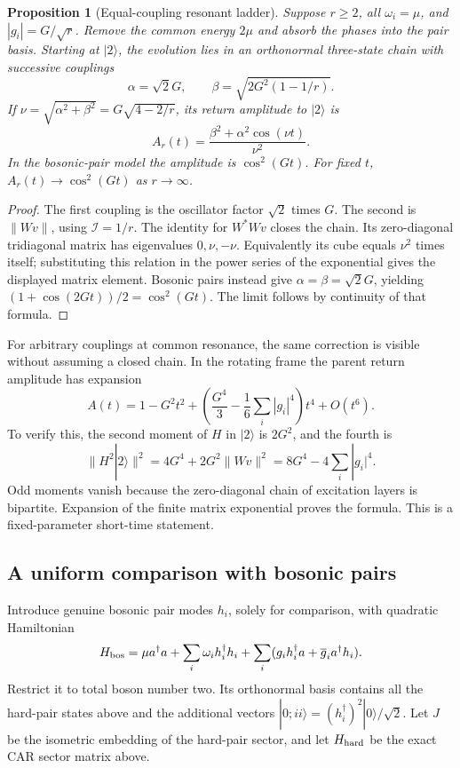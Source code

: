 \documentclass[11pt]{article}
\newtheorem{proposition}[theorem]{Proposition}
\theoremstyle{remark}
\begin{document}
\begin{proposition}[Equal-coupling resonant ladder]
\label{prop:v20v57-ladder}
Suppose \(r\geq2\), all \(\omega_i=\mu\), and
\(|g_i|=G/\sqrt r\).  Remove the common energy \(2\mu\)
and absorb the phases into the pair basis.  Starting at
\(|2\rangle\), the evolution lies in an orthonormal
three-state chain with successive couplings
\[
 \alpha=\sqrt2G,\qquad
 \beta=\sqrt{2G^2(1-1/r)}.
\]
If \(\nu=\sqrt{\alpha^2+\beta^2}=G\sqrt{4-2/r}\), its
return amplitude to \(|2\rangle\) is
\[
 A_r(t)=\frac{\beta^2+\alpha^2\cos(\nu t)}{\nu^2}.
\]
In the bosonic-pair model the amplitude is \(\cos^2(Gt)\).
For fixed \(t\), \(A_r(t)\to\cos^2(Gt)\) as \(r\to\infty\).
\end{proposition}
\begin{proof}
The first coupling is the oscillator factor \(\sqrt2\)
times \(G\).  The second is \(\|Wv\|\), using
\(\mathcal I=1/r\).  The identity for \(W^*Wv\) closes
the chain.  Its zero-diagonal tridiagonal matrix has
eigenvalues \(0,\nu,-\nu\).  Equivalently its cube equals
\(\nu^2\) times itself; substituting this relation in the
power series of the exponential gives the displayed
matrix element.  Bosonic pairs instead give
\(\alpha=\beta=\sqrt2G\), yielding
\((1+\cos(2Gt))/2=\cos^2(Gt)\).
The limit follows by continuity of that formula.
\end{proof}

For arbitrary couplings at common resonance, the same correction
is visible without assuming a closed chain.  In the rotating
frame the parent return amplitude has expansion
\[
 A(t)=1-G^2t^2+
 \left(\frac{G^4}{3}-\frac16\sum_i|g_i|^4\right)t^4+O(t^6).
\]
To verify this, the second moment of \(H\) in \(|2\rangle\)
is \(2G^2\), and the fourth is
\[
 \|H^2|2\rangle\|^2=4G^4+2G^2\|Wv\|^2
                       =8G^4-4\sum_i|g_i|^4.
\]
Odd moments vanish because the zero-diagonal chain of
excitation layers is bipartite.  Expansion of the finite
matrix exponential proves the formula.  This is a
fixed-parameter short-time statement.

\subsection{A uniform comparison with bosonic pairs}

Introduce genuine bosonic pair modes \(h_i\), solely for
comparison, with quadratic Hamiltonian
\[
 H_{\rm bos}=\mu a^\dagger a+\sum_i\omega_i h_i^\dagger h_i+
            \sum_i(g_i h_i^\dagger a+\overline g_i a^\dagger h_i).
\]
Restrict it to total boson number two.  Its orthonormal basis
contains all the hard-pair states above and the additional
vectors \(|0;ii\rangle=(h_i^\dagger)^2|0\rangle/\sqrt2\).
Let \(J\) be the isometric embedding of the hard-pair sector,
and let \(H_{\rm hard}\) be the exact CAR sector matrix above.
\end{document}
